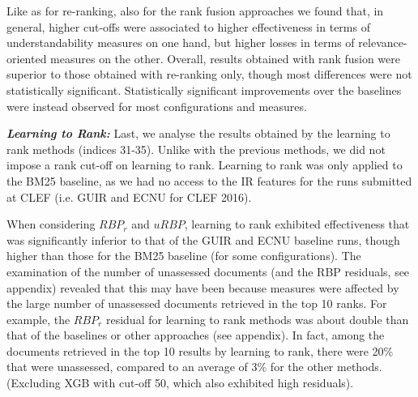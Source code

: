 Like as for re-ranking, also for the rank fusion approaches we found that, in general, higher cut-offs were associated to higher effectiveness in terms of understandability measures on one hand, but higher losses in terms of relevance-oriented measures on the other. Overall, results obtained with rank fusion were superior to those obtained with re-ranking only, though most differences were not statistically significant. Statistically significant improvements over the baselines were instead observed for most configurations and measures.  


\textit{\textbf{Learning to Rank:}} Last, we analyse the results obtained by the learning to rank methods (indices 31-35). Unlike with the previous methods, we did not impose a rank cut-off on learning to rank. Learning to rank was only applied to the BM25 baseline, as we had no access to the IR features for the runs submitted at CLEF (i.e. GUIR and ECNU for CLEF 2016).

When considering $RBP_r$ and $uRBP$, learning to rank exhibited effectiveness that was significantly inferior to that of the GUIR and ECNU baseline runs, though higher than those for the BM25 baseline (for some configurations). The examination of the number of unassessed documents (and the RBP residuals, see appendix) revealed that this may have been because measures were affected by the large number of unassessed documents retrieved in the top 10 ranks. For example, the $RBP_r$ residual for learning to rank methods was about double than that of the baselines or other approaches (see appendix). In fact, among the documents retrieved in the top 10 results by learning to rank, there were 20\% that were unassessed, compared to an average of 3\% for the other methods. (Excluding XGB with cut-off 50, which also exhibited high residuals). 


